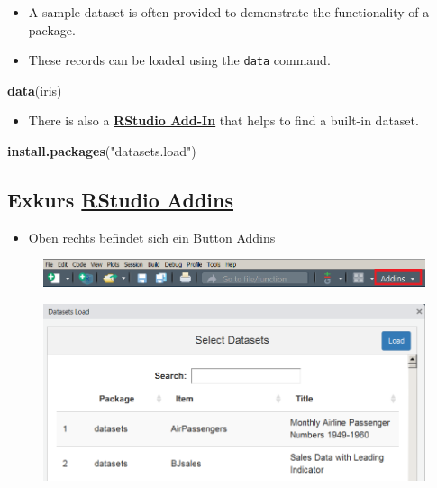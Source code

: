 \documentclass[10pt,]{article}
\newenvironment{Shaded}{\begin{snugshade}}{\end{snugshade}}
\newcommand{\KeywordTok}[1]{\textcolor[rgb]{0.13,0.29,0.53}{\textbf{#1}}}
\newcommand{\StringTok}[1]{\textcolor[rgb]{0.31,0.60,0.02}{#1}}
\newcommand{\NormalTok}[1]{#1}
\providecommand{\tightlist}{%
  \setlength{\itemsep}{0pt}\setlength{\parskip}{0pt}}
\begin{document}
\begin{itemize}
\tightlist
\item
  A sample dataset is often provided to demonstrate the functionality of
  a package.
\item
  These records can be loaded using the \texttt{data} command.
\end{itemize}

\begin{Shaded}
\begin{Highlighting}[]
\KeywordTok{data}\NormalTok{(iris)}
\end{Highlighting}
\end{Shaded}

\begin{itemize}
\tightlist
\item
  There is also a
  \href{https://github.com/bquast/datasets.load}{\textbf{RStudio
  Add-In}} that helps to find a built-in dataset.
\end{itemize}

\begin{Shaded}
\begin{Highlighting}[]
\KeywordTok{install.packages}\NormalTok{(}\StringTok{"datasets.load"}\NormalTok{)}
\end{Highlighting}
\end{Shaded}

\subsection{\texorpdfstring{Exkurs
\href{https://cran.r-project.org/web/packages/addinslist/README.html}{RStudio
Addins}}{Exkurs RStudio Addins}}\label{exkurs-rstudio-addins}

\begin{itemize}
\tightlist
\item
  Oben rechts befindet sich ein Button Addins
\end{itemize}

\begin{figure}
\centering
\includegraphics{figure/addins.PNG}
\caption{}
\end{figure}

\begin{figure}
\centering
\includegraphics{figure/datasetsload.PNG}
\caption{}
\end{figure}
\end{document}
